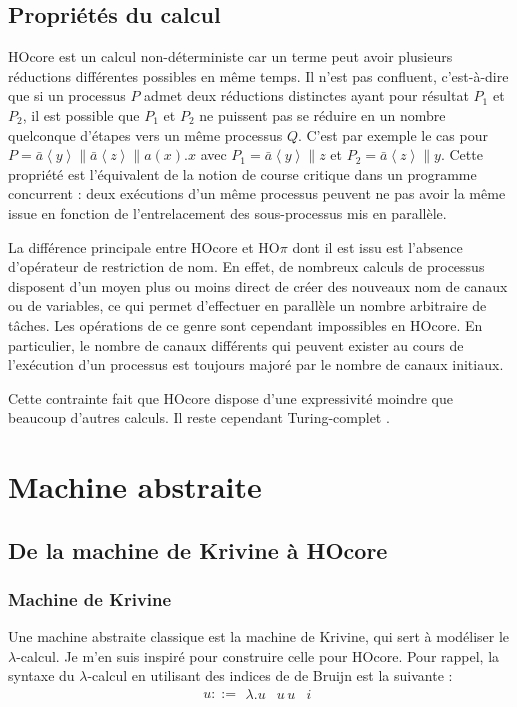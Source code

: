 \documentclass[11pt]{article}
\newcommand{\send}[2]{\bar{#1}\left\langle #2\right\rangle}
\begin{document}
\subsection{Propriétés du calcul}
\label{sec-2-2}

HOcore est un calcul non-déterministe car un terme peut avoir plusieurs réductions différentes possibles en même temps.
Il n'est pas confluent, c'est-à-dire que si un processus $P$ admet deux réductions distinctes ayant pour résultat $P_1$ et $P_2$, il est possible que $P_1$ et $P_2$ ne puissent pas se réduire en un nombre quelconque d'étapes vers un même processus $Q$. C'est par exemple le cas pour $P=\send{a}y\parallel \send{a}z\parallel a(x).x$ avec $P_1 = \send{a}y \parallel z$ et $P_2 = \send{a}z \parallel y$.
Cette propriété est l'équivalent de la notion de course critique dans un programme concurrent : deux exécutions d'un même processus peuvent ne pas avoir la même issue en fonction de l'entrelacement des sous-processus mis en parallèle.

La différence principale entre HOcore et HO$\pi$ dont il est issu est l'absence d'opérateur de restriction de nom.
En effet, de nombreux calculs de processus disposent d'un moyen plus ou moins direct de créer des nouveaux nom de canaux ou de variables, ce qui permet d'effectuer en parallèle un nombre arbitraire de tâches.
Les opérations de ce genre sont cependant impossibles en HOcore. En particulier, le nombre de canaux différents qui peuvent exister au cours de l'exécution d'un processus est toujours majoré par le nombre de canaux initiaux.

Cette contrainte fait que HOcore dispose d'une expressivité moindre que beaucoup d'autres calculs. Il reste cependant Turing-complet \cite{Lanese08}.

\section{Machine abstraite}
\label{sec-3}
\subsection{De la machine de Krivine à HOcore}
\label{sec-3-1}
\subsubsection{Machine de Krivine}
\label{sec-3-1-1}

Une machine abstraite classique est la machine de Krivine, qui sert à modéliser le $\lambda$-calcul. Je m'en suis inspiré pour construire celle pour HOcore.
Pour rappel, la syntaxe du $\lambda$-calcul en utilisant des indices de de Bruijn est la suivante :
\[u::=\begin{array}{c|c|c}\lambda.u & u\, u & i\end{array}\]
\end{document}
